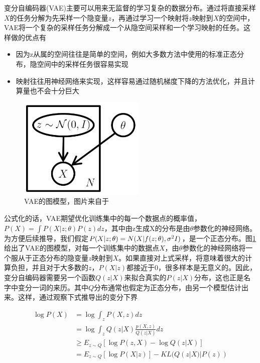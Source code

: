\documentclass[UTF8,openany,AutoFakeBold,AutoFakeSlant,cs4size]{ctexbook}
\begin{document}
变分自编码器(VAE)\cite{kingma2014autoencoding}主要可以用来无监督的学习复杂的数据分布。通过将直接采样$X$的任务分解为先采样一个隐变量$z$，再通过学习一个映射将$z$映射到$X$的空间中，VAE将一个复杂的采样任务分解成一个从隐空间采样和一个学习映射的任务。这样做的优点有
\begin{itemize}
	\item 因为z从属的空间往往是简单的空间，例如大多数方法中使用的标准正态分布，隐空间中的采样任务很容易实现
	\item 映射往往用神经网络来实现，这样容易通过随机梯度下降的方法优化，并且计算量也不会十分巨大
\end{itemize}

\begin{figure}
\centering
\includegraphics[width=6cm]{./images/vae_model.png}
\caption{VAE的图模型，图片来自于\cite{doersch2016tutorial}}
\label{vae_model}
\end{figure}

公式化的话，VAE期望优化训练集中的每一个数据点的概率值，$P(X) = \int P(X | z; \theta) P(z) dz$，其中由z生成X的分布是由$\theta$参数化的神经网络。为方便后续推导，我们假定$P(X | z; \theta) = N(X | f(z; \theta), \sigma^2 \* I)$，是一个正态分布。图\ref{vae_model}给出了VAE的图模型，对每一个训练集中的数据点$X$，由$\theta$参数化的神经网络将一个服从于正态分布的隐变量$z$映射到$X$。如果直接对上式采样，将意味着很大的计算负担，并且对于大多数的$z$，$P(X|z)$都接近于$0$，很多样本是无意义的。因此，变分自编码器需要另一个函数$Q(z|X)$来拟合真实的$P(z|X)$分布，这也正是名字中变分一词的来历。其中$Q$分布通常也假定为正态分布，由另一个模型估计出来。这样，通过观察下式推导出的变分下界

\begin{equation}
	\begin{aligned}
		\log P(X) &= \log \int_{z} P(X, z) dz \\
		&= \log \int_{z} Q(z | X)\frac{p(X, z)}{Q(z | X)} dz \\
		&\geq  E_{z \sim Q}[\log P(z, X) - \log Q(z|X)] \\
		&= E_{z \sim Q}[\log P(X|z)] - KL(Q(z|X) | P(z))
	\end{aligned}
\end{equation}
\end{document}

